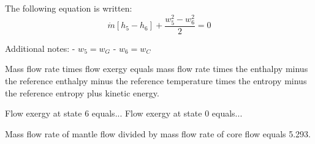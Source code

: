The following equation is written:  
\[ \dot{m} \left[ h_5 - h_6 \right] + \frac{w_5^2 - w_6^2}{2} = 0 \]  

Additional notes:  
- \( w_5 = w_G \)  
- \( w_6 = w_C \)

Mass flow rate times flow exergy equals mass flow rate times the enthalpy minus the reference enthalpy minus the reference temperature times the entropy minus the reference entropy plus kinetic energy.  

Flow exergy at state 6 equals...  
Flow exergy at state 0 equals...  

Mass flow rate of mantle flow divided by mass flow rate of core flow equals 5.293.